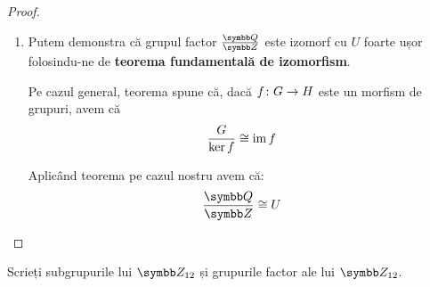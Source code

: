 \begin{proof}
\begin{enumerate}
    \item Putem demonstra că grupul factor \(\frac{\rationals}{\integers}\) este izomorf cu \(U\) foarte ușor folosindu-ne de \textbf{teorema fundamentală de izomorfism}.
    
    Pe cazul general, teorema spune că, dacă \(f \colon G \to H\) este un morfism de grupuri, avem că
    \[
        \frac{G}{\ker f} \cong \operatorname{im} f
    \]
    
    Aplicând teorema pe cazul nostru avem că:
    \[
        \frac{\rationals}{\integers} \cong U
    \]
\end{enumerate}
\end{proof}

\begin{exercise}
Scrieți subgrupurile lui \(\integersmod{12}\) și grupurile factor ale lui \(\integersmod{12}\).
\end{exercise}
